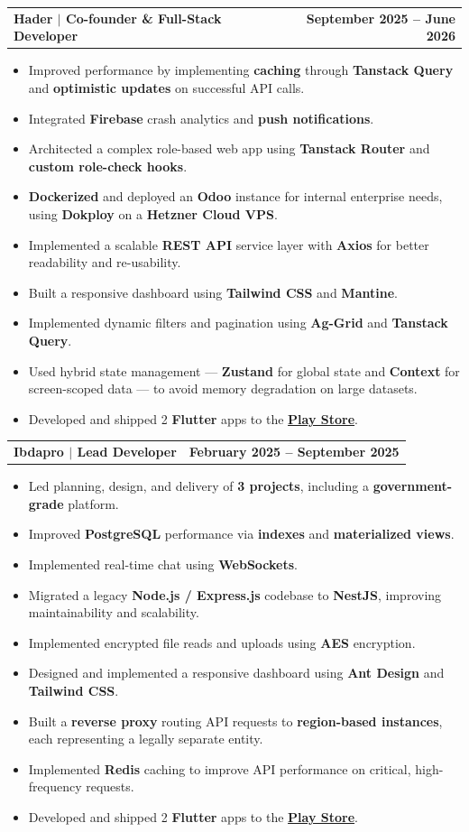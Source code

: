 \documentclass[letterpaper,11pt]{article}
\makeatletter
\newcommand{\resumeItem}[1]{
  \item\small{
    {#1 \vspace{-2pt}}
  }
}
\newcommand{\resumeProjectHeading}[2]{
  \vspace{-2pt}\item
    \begin{tabular*}{1.0\textwidth}[t]{l@{\extracolsep{\fill}}r}
      \textbf{#1} & \textbf{\small #2} \\
    \end{tabular*}\vspace{-2pt}
}
\newcommand{\resumeItemListStart}{\begin{itemize}}
\newcommand{\resumeItemListEnd}{\end{itemize}\vspace{0pt}}
\makeatother
\begin{document}
\resumeProjectHeading
{\textbf{Hader $|$ Co-founder \& Full-Stack Developer}}{September 2025 -- June 2026}
\resumeItemListStart
\resumeItem{Improved performance by implementing \textbf{caching} through \textbf{Tanstack Query} and \textbf{optimistic updates} on successful API calls.}
\resumeItem{Integrated \textbf{Firebase} crash analytics and \textbf{push notifications}.}
\resumeItem{Architected a complex role-based web app using \textbf{Tanstack Router} and \textbf{custom role-check hooks}.}
\resumeItem{\textbf{Dockerized} and deployed an \textbf{Odoo} instance for internal enterprise needs, using \textbf{Dokploy} on a \textbf{Hetzner Cloud VPS}.}
\resumeItem{Implemented a scalable \textbf{REST API} service layer with \textbf{Axios} for better readability and re-usability.}
\resumeItem{Built a responsive dashboard using \textbf{Tailwind CSS} and \textbf{Mantine}.}
\resumeItem{Implemented dynamic filters and pagination using \textbf{Ag-Grid} and \textbf{Tanstack Query}.}
\resumeItem{Used hybrid state management --- \textbf{Zustand} for global state and \textbf{Context} for screen-scoped data --- to avoid memory degradation on large datasets.}
\resumeItem{Developed and shipped 2 \textbf{Flutter} apps to the \href{https://play.google.com/store/apps/details?id=com.hader.pharma&hl=en}{\textbf{Play Store}}.}
\resumeItemListEnd

\resumeProjectHeading
{\textbf{Ibdapro $|$ Lead Developer}}{February 2025 -- September 2025}
\resumeItemListStart
\resumeItem{Led planning, design, and delivery of \textbf{3 projects}, including a \textbf{government-grade} platform.}
\resumeItem{Improved \textbf{PostgreSQL} performance via \textbf{indexes} and \textbf{materialized views}.}
\resumeItem{Implemented real-time chat using \textbf{WebSockets}.}
\resumeItem{Migrated a legacy \textbf{Node.js / Express.js} codebase to \textbf{NestJS}, improving maintainability and scalability.}
\resumeItem{Implemented encrypted file reads and uploads using \textbf{AES} encryption.}
\resumeItem{Designed and implemented a responsive dashboard using \textbf{Ant Design} and \textbf{Tailwind CSS}.}
\resumeItem{Built a \textbf{reverse proxy} routing API requests to \textbf{region-based instances}, each representing a legally separate entity.}
\resumeItem{Implemented \textbf{Redis} caching to improve API performance on critical, high-frequency requests.}
\resumeItem{Developed and shipped 2 \textbf{Flutter} apps to the \href{https://play.google.com/store/apps/dev?id=4999982593960140954\&hl=en}{\textbf{Play Store}}.}
\resumeItemListEnd
\end{document}
